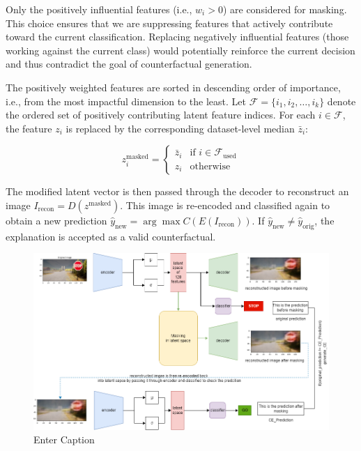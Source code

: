 Only the positively influential features (i.e., $w_i > 0$) are considered for masking. This choice ensures that we are suppressing features that actively contribute toward the current classification. Replacing negatively influential features (those working against the current class) would potentially reinforce the current decision and thus contradict the goal of counterfactual generation.

The positively weighted features are sorted in descending order of importance, i.e., from the most impactful dimension to the least. Let $\mathcal{F} = \{i_1, i_2, \dots, i_k\}$ denote the ordered set of positively contributing latent feature indices. For each $i \in \mathcal{F}$, the feature $z_i$ is replaced by the corresponding dataset-level median $\bar{z}_i$:

\[
z_i^{\text{masked}} = 
\begin{cases}
\bar{z}_i & \text{if } i \in \mathcal{F}_{\text{used}} \\
z_i & \text{otherwise}
\end{cases}
\]

The modified latent vector is then passed through the decoder to reconstruct an image $I_{\text{recon}} = D(z^{\text{masked}})$. This image is re-encoded and classified again to obtain a new prediction $\hat{y}_{\text{new}} = \arg\max C(E(I_{\text{recon}}))$. If $\hat{y}_{\text{new}} \ne \hat{y}_{\text{orig}}$, the explanation is accepted as a valid counterfactual.

\begin{figure}
    \centering
    \includegraphics[width=0.95\linewidth]{img//masking//lime_on_latent/LIME_on_latent_space_masking.drawio.png}
    \caption{Enter Caption}
    \label{fig:lime_latent_workflow}
\end{figure}

